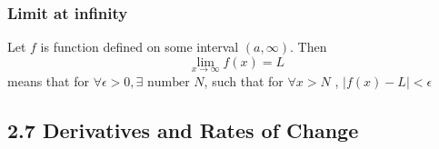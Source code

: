 \documentclass{article}
\begin{document}
\subsubsection*{Limit at infinity}
Let \(f\) is function defined on some interval  \( (a, \infty ) \). Then 
\[
\lim_{x \to \infty} f(x) = L
\]
means that for \( \forall \epsilon > 0 , \exists \text{ number } N \), such that 
for \( \forall x > N \) , \( |f(x) - L| < \epsilon \)

\subsection*{2.7 Derivatives and Rates of Change}
\end{document}
